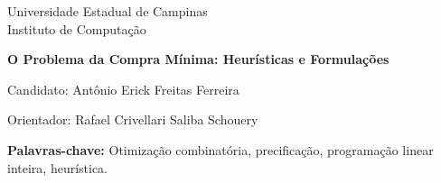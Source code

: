     {
        \centering
    
        {\large Universidade Estadual de Campinas \\}
        {\large Instituto de Computação \\}
        
        {\LARGE \textbf{O Problema da Compra Mínima: Heurísticas e Formulações} \\[1cm]}
        
        {\large Candidato: Antônio Erick Freitas Ferreira \\}

        {\large Orientador: Rafael Crivellari Saliba Schouery}
        
    }

    

    {\textbf{Palavras-chave:} Otimização combinatória, precificação, programação linear inteira, heurística.}
